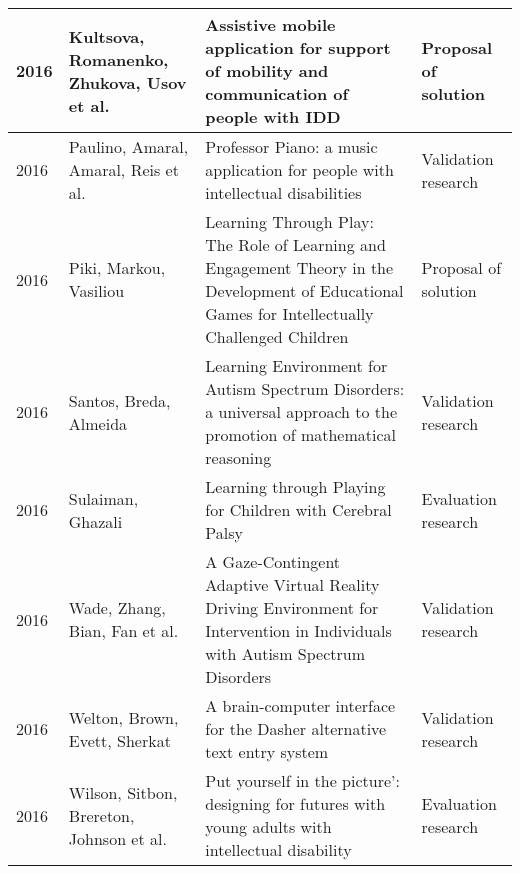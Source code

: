 \documentclass[utf8,english]{gradu3}
\begin{document}
\begin{longtable}{|>{\scriptsize}l|>{\scriptsize}p{3cm}|>{\scriptsize}p{8cm}|>{\scriptsize}p{2.4cm}|}
  2016          & Kultsova, Romanenko, Zhukova, Usov et al.                            & Assistive mobile application for support of mobility and communication of people with IDD                                                                                                    & Proposal of solution       \\ \hline
  2016          & Paulino, Amaral, Amaral, Reis et al.                                 & Professor Piano: a music application for people with intellectual disabilities                                                                                                               & Validation research        \\ \hline
  2016          & Piki, Markou, Vasiliou                                               & Learning Through Play: The Role of Learning and Engagement Theory in the Development of Educational Games for Intellectually Challenged Children                                             & Proposal of solution       \\ \hline
  2016          & Santos, Breda, Almeida                                               & Learning Environment for Autism Spectrum Disorders: a universal approach to the promotion of mathematical reasoning                                                                          & Validation research        \\ \hline
  2016          & Sulaiman, Ghazali                                                    & Learning through Playing for Children with Cerebral Palsy                                                                                                                                    & Evaluation research        \\ \hline
  2016          & Wade, Zhang, Bian, Fan et al.                                        & A Gaze-Contingent Adaptive Virtual Reality Driving Environment for Intervention in Individuals with Autism Spectrum Disorders                                                                & Validation research        \\ \hline
  2016          & Welton, Brown, Evett, Sherkat                                        & A brain-computer interface for the Dasher alternative text entry system                                                                                                                      & Validation research        \\ \hline
  2016          & Wilson, Sitbon, Brereton, Johnson et al.                             & Put yourself in the picture': designing for futures with young adults with intellectual disability                                                                                           & Evaluation research        \\ \hline

\end{longtable}
\end{document}
